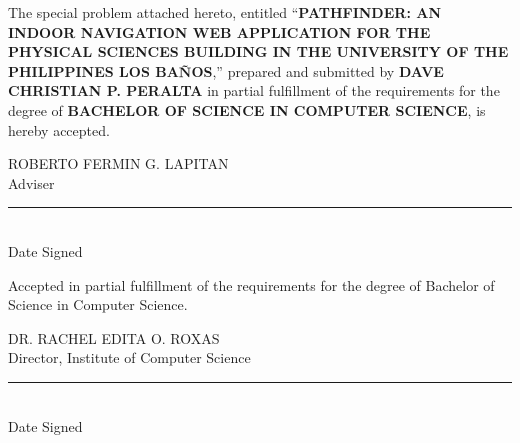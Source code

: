 \thispagestyle{empty}

\newcommand{\signatory}[2]{%
  \begin{minipage}[t]{0.47\linewidth}\centering
    #1\\ #2\\[1.6em]
    \rule{2.3in}{0.4pt}\\ Date Signed
  \end{minipage}}

{\singlespacing
\noindent The special problem attached hereto, entitled
``\textbf{PATHFINDER: AN INDOOR NAVIGATION WEB APPLICATION FOR THE PHYSICAL
SCIENCES BUILDING IN THE UNIVERSITY OF THE PHILIPPINES LOS BA\~{N}OS},''
prepared and submitted by \textbf{DAVE CHRISTIAN P. PERALTA} in partial
fulfillment of the requirements for the degree of \textbf{BACHELOR OF SCIENCE
IN COMPUTER SCIENCE}, is hereby accepted.

\vspace{1.5em}
\begin{center}
\signatory{ROBERTO FERMIN G. LAPITAN}{Adviser}
\end{center}

\vspace{1.0em}
\noindent Accepted in partial fulfillment of the requirements for the degree of
Bachelor of Science in Computer Science.

\vspace{1.2em}
\begin{center}
\signatory{DR. RACHEL EDITA O. ROXAS}{Director, Institute of Computer Science}

\end{center}}
\clearpage
